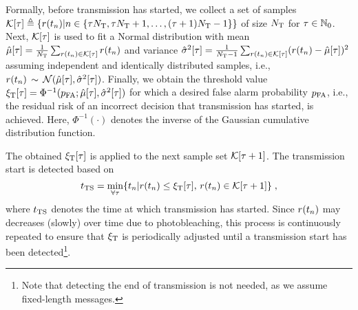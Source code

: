 Formally, before transmission has started, we collect a set of samples $\mathcal{K}[\tau] \triangleq \{r(t_n)|n \in \{\tau N_\mathrm{T}, \tau N_\mathrm{T} + 1, \hdots, (\tau+1) N_\mathrm{T} -1 \}\}$ of size $N_\mathrm{T}$ for $\tau \in \mathbb{N}_0$. Next, $\mathcal{K}[\tau]$ is used to fit a Normal distribution with mean $\hat{\mu}[\tau] = \frac{1}{N_\mathrm{T}}\sum_{r(t_n) \in \mathcal{K}[\tau]}r(t_n)$ and variance $\hat{\sigma}^2[\tau] = \frac{1}{N_\mathrm{T}-1}\sum_{r(t_n) \in \mathcal{K}[\tau]} (r(t_n) - \hat{\mu}[\tau])^2$ assuming independent and identically distributed samples, i.e., $r(t_n)\,\sim\,\mathcal{N}(\hat{\mu}[\tau], \hat{\sigma}^2[\tau])$. Finally, we obtain the threshold value $\xi_\mathrm{T}[\tau] = \Phi^{-1}(p_\mathrm{FA}; \hat{\mu}[\tau], \hat{\sigma}^2[\tau])$ for which a desired false alarm probability $p_\mathrm{FA}$, i.e., the residual risk of an incorrect decision that transmission has started, is achieved. Here, $\Phi^{-1}(\cdot)$ denotes the inverse of the Gaussian cumulative distribution function.

The obtained $\xi_\mathrm{T}[\tau]$ is applied to the next sample set $\mathcal{K}[\tau+1]$. The transmission start is detected based on
\begin{equation}
    t_\mathrm{TS} = \min_{\forall \tau}\{t_n|r(t_n) \leq \xi_\mathrm{T}[\tau],\, r(t_n) \in \mathcal{K}[\tau+1]\}\;,
\end{equation}
where $t_\mathrm{TS}$ denotes the time at which transmission has started. Since $r(t_n)$ may decreases (slowly) over time due to photobleaching, this process is continuously repeated to ensure that $\xi_\mathrm{T}$ is periodically adjusted until a transmission start has been detected\footnote{Note that detecting the end of transmission is not needed, as we assume fixed-length messages.}.
%
\scaleSubsubsection
